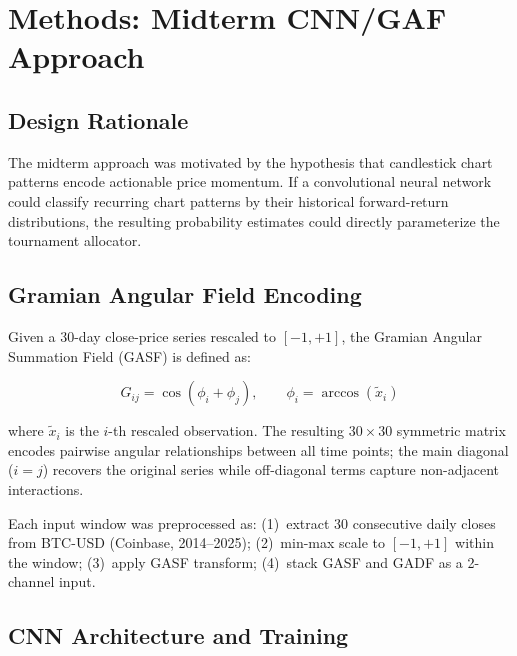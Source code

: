 \documentclass[11pt,letterpaper]{article}
\begin{document}
\section{Methods: Midterm CNN/GAF Approach}
\label{sec:cnn}

\subsection{Design Rationale}

The midterm approach was motivated by the hypothesis that candlestick chart
patterns encode actionable price momentum.  If a convolutional neural network
could classify recurring chart patterns by their historical forward-return
distributions, the resulting probability estimates could directly parameterize
the tournament allocator.

\subsection{Gramian Angular Field Encoding}

Given a 30-day close-price series rescaled to $[-1,+1]$, the Gramian Angular
Summation Field (GASF) is defined as:

\begin{equation}
  G_{ij} = \cos(\phi_i + \phi_j), \qquad \phi_i = \arccos(\tilde{x}_i)
  \label{eq:gasf}
\end{equation}

where $\tilde{x}_i$ is the $i$-th rescaled observation.  The resulting
$30{\times}30$ symmetric matrix encodes pairwise angular relationships between
all time points; the main diagonal ($i=j$) recovers the original series while
off-diagonal terms capture non-adjacent interactions.

Each input window was preprocessed as: (1)~extract 30 consecutive daily closes
from BTC-USD (Coinbase, 2014--2025); (2)~min-max scale to $[-1,+1]$ within the
window; (3)~apply GASF transform; (4)~stack GASF and GADF as a 2-channel input.

\subsection{CNN Architecture and Training}
\end{document}
